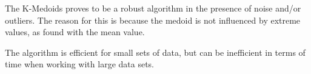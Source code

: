 The K-Medoids proves to be a robust algorithm in the presence of noise and/or 
outliers. The reason for this is because the medoid is not influenced by extreme 
values, as found with the mean value.

The algorithm is efficient for small sets of data, but can be inefficient in 
terms of time when working with large data sets.
